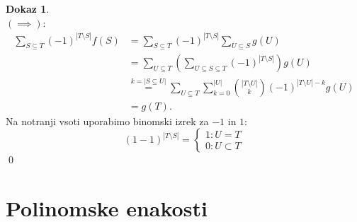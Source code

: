 \documentclass[a4paper, 12pt]{book}
\theoremstyle{definition}
\newtheorem{pro}[counter]{Dokaz}
\theoremstyle{remark}
\begin{document}
\begin{pro} \text{} \\
  $(\implies)$:
  \begin{align*}
    \sum_{S \subseteq T} (-1)^{|T \setminus S|} f(S) &= \sum_{S \subseteq T} (-1)^{|T \setminus S|} \sum_{U \subseteq S} g(U) \\
    &= \sum_{U \subseteq T} \left(\sum_{U \subseteq S \subseteq T} (-1)^{|T \setminus S|}\right) g(U) \\
    &\stackrel{k=|S \subseteq U|}{=} \sum_{U \subseteq T}
      \sum_{k=0}^{|U|} \binom{|T \setminus U|}{k} (-1)^{|T \setminus U| - k} g(U) \\
    &= g(T).
  \end{align*}
  Na notranji vsoti uporabimo binomski izrek za $-1$ in $1:$
  \begin{equation*}
    (1-1)^{|T \setminus S|} =
    \begin{cases}
      1: U = T \\
      0: U \subset T
    \end{cases}
  \end{equation*}
  \qed
\end{pro}


\section{Polinomske enakosti}
\end{document}
